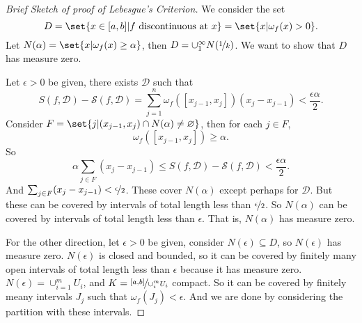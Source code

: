 \begin{proof}[Brief Sketch of proof of Lebesgue's Criterion]
    We consider the set
    \[
        D = \set{x \in [a,b]| f\text{ discontinuous at }x} = \set{x | \omega_f(x) > 0}.
    \]
    Let \(N(\alpha) = \set{x|\omega_f(x)\geq \alpha}\), then \(D = \cup^\infty_1 N(\nicefrac{1}{k})\). We want to show that \(D\) has measure zero.

    Let \(\epsilon > 0\) be given, there exists \(\mathcal{D}\) such that
    \[
        S(f, \mathcal{D}) - \mathscr{S}(f,\mathcal{D}) = \sum_{j=1}^{n} \omega_f([x_{j-1},x_j])(x_j - x_{j-1}) < \frac{\epsilon \alpha}{2}.
    \]
    Consider \(F = \set{j|(x_{j-1},x_j) \cap N(\alpha) \neq \varnothing }\), then for each \(j \in F\),
    \[
        \omega_f([x_{j-1},x_j]) \geq \alpha.
    \]
    So
    \[
        \alpha\sum_{j\in F} (x_j - x_{j-1}) \leq S(f,\mathcal{D}) - \mathscr{S}(f,\mathcal{D}) < \frac{\epsilon \alpha}{2}.
    \]
    And \(\sum_{j\in F}(x_j - x_{j-1}) < \nicefrac{\epsilon}{2}\). These cover \(N(\alpha)\) except perhaps for \(\mathcal{D}\). But these can be covered by intervals of total length less than \(\nicefrac{\epsilon}{2}\). So \(N(\alpha)\) can be covered by intervals of total length less than \(\epsilon\). That is, \(N(\alpha)\) has measure zero.

    For the other direction, let \(\epsilon>0\) be given, consider \(N(\epsilon) \subseteq D\), so \(N(\epsilon)\) has measure zero. \(N(\epsilon)\) is closed and bounded, so it can be covered by finitely many open intervals of total length less than \(\epsilon\) because it has measure zero. \(N(\epsilon) = \cup_{i=1}^m U_i\), and \(K = \nicefrac{[a,b]}{\cup^m_i U_i}\) compact. So it can be covered by finitely meany intervals \(J_j\) such that \(\omega_f(J_j) < \epsilon\). And we are done by considering the partition with these intervals.
\end{proof}
